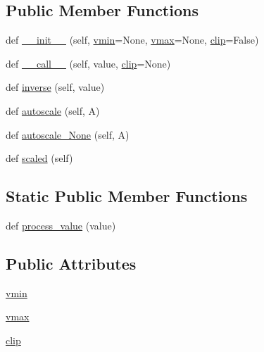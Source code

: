 \subsection*{Public Member Functions}
\begin{DoxyCompactItemize}
\item 
def \hyperlink{classmatplotlib_1_1colors_1_1Normalize_ae35ef95606b0b77e11efa41e07041133}{\+\_\+\+\_\+init\+\_\+\+\_\+} (self, \hyperlink{classmatplotlib_1_1colors_1_1Normalize_a27ff9acd0e6407968e6d41cc91ab8441}{vmin}=None, \hyperlink{classmatplotlib_1_1colors_1_1Normalize_ad433e4289413f8976b886044da439a0f}{vmax}=None, \hyperlink{classmatplotlib_1_1colors_1_1Normalize_a7355c143b0fcdd0ec9998c02e2962a8b}{clip}=False)
\item 
def \hyperlink{classmatplotlib_1_1colors_1_1Normalize_ac322f42dbcaca3daed36a5801f09dce4}{\+\_\+\+\_\+call\+\_\+\+\_\+} (self, value, \hyperlink{classmatplotlib_1_1colors_1_1Normalize_a7355c143b0fcdd0ec9998c02e2962a8b}{clip}=None)
\item 
def \hyperlink{classmatplotlib_1_1colors_1_1Normalize_ac7e87a64910245d444c76a50f74ff0cb}{inverse} (self, value)
\item 
def \hyperlink{classmatplotlib_1_1colors_1_1Normalize_ab4dcc61fd1f11e25bce825dab4669816}{autoscale} (self, A)
\item 
def \hyperlink{classmatplotlib_1_1colors_1_1Normalize_ab3a2ef98b9e877627811679b8eb40fe8}{autoscale\+\_\+\+None} (self, A)
\item 
def \hyperlink{classmatplotlib_1_1colors_1_1Normalize_af6a4ef7fe23e5c00dbecad43c813061e}{scaled} (self)
\end{DoxyCompactItemize}
\subsection*{Static Public Member Functions}
\begin{DoxyCompactItemize}
\item 
def \hyperlink{classmatplotlib_1_1colors_1_1Normalize_a7a7f9ffecddbbd480766db4aef7567c3}{process\+\_\+value} (value)
\end{DoxyCompactItemize}
\subsection*{Public Attributes}
\begin{DoxyCompactItemize}
\item 
\hyperlink{classmatplotlib_1_1colors_1_1Normalize_a27ff9acd0e6407968e6d41cc91ab8441}{vmin}
\item 
\hyperlink{classmatplotlib_1_1colors_1_1Normalize_ad433e4289413f8976b886044da439a0f}{vmax}
\item 
\hyperlink{classmatplotlib_1_1colors_1_1Normalize_a7355c143b0fcdd0ec9998c02e2962a8b}{clip}
\end{DoxyCompactItemize}



